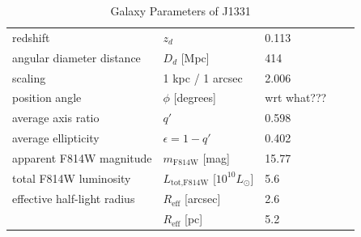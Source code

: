 \begin{table}
\centering
\begin{minipage}{140mm}
\caption{Galaxy Parameters of J1331}
\begin{tabular}{lllrl}
\hline
redshift                  & $z_d$ & 0.113 & \citep{SWELLSIII}\\
angular diameter distance & $D_d$ [Mpc] & 414 & \\
scaling                   & 1 kpc / 1 arcsec & 2.006 & \\
position angle            & $\phi$ [degrees] & wrt what???\\
average axis ratio & $q'$ & 0.598\\
average ellipticity & $\epsilon = 1 - q'$ & 0.402 & \\
apparent F814W magnitude & $m_\text{F814W}$ [mag] & 15.77 & \\
total F814W luminosity & $L_\text{tot,F814W}$ [$10^{10} L_\odot$] & 5.6 & \\
effective half-light radius & $R_\text{eff}$ [arcsec] & 2.6 & \\
& $R_\text{eff}$ [pc]& 5.2 & \\
\hline
\end{tabular}
\end{minipage}
\end{table}
